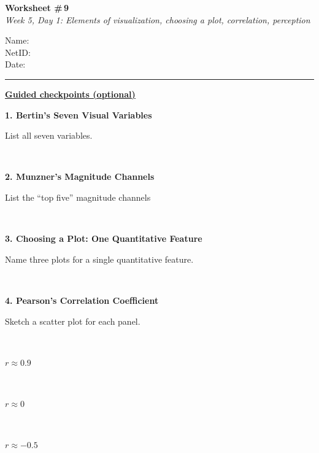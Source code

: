 \documentclass[11pt]{article}
\newcommand{\blankspace}[1]{%
  \vspace{0.3em}
  \begin{minipage}[t][#1][t]{\linewidth}
  \end{minipage}
  \vspace{0.3em}
}
\newcommand{\guidedopen}[4]{%
  \noindent\textbf{#1}\\[0.18em]
  \noindent
  \begin{minipage}[t]{0.485\textwidth}
    #2
    \blankspace{#3}
  \end{minipage}
  \hfill
  \begin{minipage}[t]{0.485\textwidth}
    \blankspace{#4}
  \end{minipage}
  \\[0.4em]
}
\newcommand{\panelbox}[3]{%
  \begin{minipage}[t]{\dimexpr#1+2\fboxsep+2\fboxrule\relax}
    \framebox[#1][c]{\rule{0pt}{#2}}%
    \if\relax\detokenize{#3}\relax\else
      \\[0.25em]{\centering\small #3\par}%
    \fi
  \end{minipage}%
}
\begin{document}
\RaggedRight

\noindent
\begin{minipage}[t]{0.55\textwidth}
  \vspace{0pt}
  {\LARGE \textbf{Worksheet \#\,9}} \\[0.18em]
  {\large \textit{Week 5, Day 1: Elements of visualization, choosing a plot, correlation, perception}}
\end{minipage}
\hfill
\begin{minipage}[t]{0.40\textwidth}
  \vspace{0pt}
  \small
  Name: \underline{\hspace{4.5cm}} \\[0.35em]
  NetID: \underline{\hspace{4.3cm}} \\[0.35em]
  Date: \underline{\hspace{4.4cm}} \\
\end{minipage}

\vspace{0.6em}
\noindent\rule{\linewidth}{0.6pt}
\vspace{0.1em}

\noindent\underline{\textbf{Guided checkpoints (optional)}}
\vspace{0.8em}

\guidedopen{1. Bertin's Seven Visual Variables}{
List all seven variables.
}{4.4cm}{5.3cm}

\vfill

\guidedopen{2. Munzner's Magnitude Channels}{
List the ``top five'' magnitude channels
}{4.4cm}{5.3cm}

\vfill

\guidedopen{3. Choosing a Plot: One Quantitative Feature}{
Name three plots for a single quantitative feature. 
}{4.3cm}{5.4cm}

\vfill

\newpage

\guidedopen{4. Pearson's Correlation Coefficient}{
Sketch a scatter plot for each panel.

\vspace{0.45em}

\noindent
\panelbox{2.3cm}{2.0cm}{$r \approx 0.9$}\hfill
\panelbox{2.3cm}{2.0cm}{$r \approx 0$}\hfill
\panelbox{2.3cm}{2.0cm}{$r \approx -0.5$}
}{0.4cm}{3.9cm}
\end{document}
